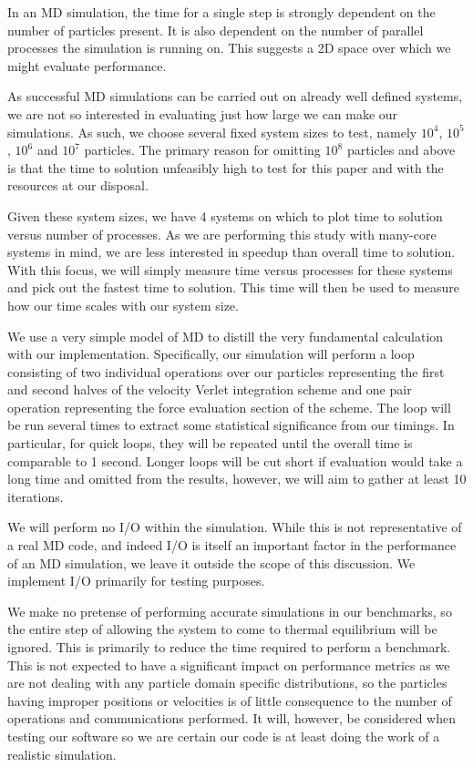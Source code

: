 %
In an MD simulation, the time for a single step is strongly dependent
on the number of particles present.
%
It is also dependent on the number of parallel processes the simulation
is running on.
%
This suggests a 2D space over which we might evaluate performance.

%
As successful MD simulations can be carried out on already well defined
systems, we are not so interested in evaluating just how large we can
make our simulations.
%
As such, we choose several fixed system sizes to test, namely
$10^4$, $10^5$, $10^6$ and $10^7$
particles.
%
The primary reason for omitting $10^8$ particles and above is that the time to
solution unfeasibly high to test for this paper and with the resources
at our disposal.

Given these system sizes, we have 4 systems on which to plot time to solution
versus number of processes.
%
As we are performing this study with many-core systems in mind,
we are less interested in speedup than overall time to solution.
%
With this focus, we will simply measure time versus processes for these
systems and pick out the fastest time to solution.
%
This time will then be used to measure how our time scales with
our system size.

%
We use a very simple model of MD to distill the very fundamental calculation
with our implementation.
%
Specifically, our simulation will perform a loop consisting of two
individual operations over our particles representing the first
and second halves of the velocity Verlet integration scheme and one
pair operation representing the force evaluation section of the scheme.
%
The loop will be run several times to extract some statistical significance
from our timings.
%
In particular, for quick loops, they will be repeated until the overall
time is comparable to 1 second.
%
Longer loops will be cut short if evaluation would take a long time and omitted
from the results, however, we will aim to gather at least 10 iterations.

%
We will perform no I/O within the simulation.
%
While this is not representative of a real MD code, and indeed I/O
is itself an important factor in the performance of an MD simulation,
we leave it outside the scope of this discussion.
%
We implement I/O primarily for testing purposes.

%
We make no pretense of performing accurate simulations in our benchmarks,
so the entire step of allowing the system to come to
thermal equilibrium will be ignored.
%
This is primarily to reduce the time required to perform a benchmark.
%
This is not expected to have a significant impact on performance metrics
as we are not dealing with any particle domain specific distributions,
so the particles having improper positions or velocities is of
little consequence to the number of operations and communications
performed.
%
It will, however, be considered when testing our software so we are
certain our code is at least doing the work of a realistic simulation.



